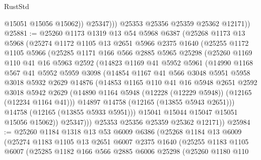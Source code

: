 \begin{lexlean}{RustStd}
\begin{coremodule}
                  @15051
                  @15056
                  @15062))
              @25347)))
        @25353
        @25356
        @25359
        @25362
        @12171))
@25881 := @25260
    @1173
    @1319
    @13
    @54
    @5968
    @6387
    (@25268
      @1173
      @13
      @5968
      (@25274
        @1172
        @1105
        @13
        @2651
        @5966
        @2375
        @1640
        (@25255
          @1172
          @1105
          @5966
          (@25285
            @1171
            @166
            @566
            @2885
            @5965
            @25298
            (@25260
              @1169
              @110
              @41
              @16
              @5963
              @2592
              (@14823
                @1169
                @41
                @5952
                @5961
                (@14990
                  @1168
                  @567
                  @41
                  @5952
                  @5959
                  @3098
                  (@14854
                    @1167
                    @41
                    @566
                    @3048
                    @5951
                    @5958
                    @3018
                    @5932
                    @2629
                    @14876
                    (@14853
                      @1165
                      @110
                      @41
                      @16
                      @5948
                      @2651
                      @2592
                      @3018
                      @5942
                      @2629
                      (@14890 @1164 @5948 (@12228 (@12229 @5948)) (@12165 (@12234 @1164 @41)))
                      @14897
                      @14758
                      (@12165 (@13855 @5943 @2651)))
                    @14758
                    (@12165 (@13855 @5933 @5951)))
                  @15041
                  @15044
                  @15047
                  @15051
                  @15056
                  @15062))
              @25347)))
        @25353
        @25356
        @25359
        @25362
        @12171))
@25984 := @25260
    @1184
    @1318
    @13
    @53
    @6009
    @6386
    (@25268
      @1184
      @13
      @6009
      (@25274
        @1183
        @1105
        @13
        @2651
        @6007
        @2375
        @1640
        (@25255
          @1183
          @1105
          @6007
          (@25285
            @1182
            @166
            @566
            @2885
            @6006
            @25298
            (@25260
              @1180
              @110

\end{coremodule}
\end{lexlean}
